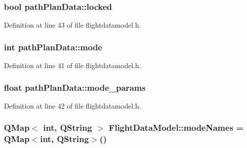 \hypertarget{group___path_ga5e07c3e8bda93b1d5dba9dd3d35c0280}{
\subsubsection[{locked}]{\setlength{\rightskip}{0pt plus 5cm}bool {\bf path\-Plan\-Data\-::locked}}}\label{group___path_ga5e07c3e8bda93b1d5dba9dd3d35c0280}


\-Definition at line 43 of file flightdatamodel.\-h.

\hypertarget{group___path_gabea436564f0d9df2abf6b4c35d505753}{
\subsubsection[{mode}]{\setlength{\rightskip}{0pt plus 5cm}int {\bf path\-Plan\-Data\-::mode}}}\label{group___path_gabea436564f0d9df2abf6b4c35d505753}


\-Definition at line 41 of file flightdatamodel.\-h.

\hypertarget{group___path_gaba12f55aa813b5f1dc707e3c1814ab14}{
\subsubsection[{mode\-\_\-params}]{\setlength{\rightskip}{0pt plus 5cm}float {\bf path\-Plan\-Data\-::mode\-\_\-params}}}\label{group___path_gaba12f55aa813b5f1dc707e3c1814ab14}


\-Definition at line 42 of file flightdatamodel.\-h.

\hypertarget{group___path_gae4137f8c1c8d4c53cea911761c13b182}{
\subsubsection[{mode\-Names}]{\setlength{\rightskip}{0pt plus 5cm}\-Q\-Map$<$ int, {\bf \-Q\-String} $>$ {\bf \-Flight\-Data\-Model\-::mode\-Names} = \-Q\-Map$<$int, {\bf \-Q\-String}$>$()}}\label{group___path_gae4137f8c1c8d4c53cea911761c13b182}


